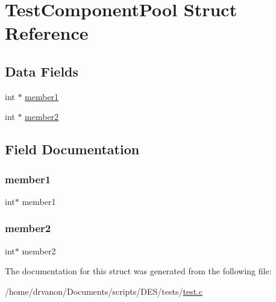 \hypertarget{struct_test_component_pool}{}\section{Test\+Component\+Pool Struct Reference}
\label{struct_test_component_pool}
\subsection*{Data Fields}
\begin{DoxyCompactItemize}
\item 
int $\ast$ \mbox{\hyperlink{struct_test_component_pool_a8a2b3ab64fa0522a285d284f6e365ab6}{member1}}
\item 
int $\ast$ \mbox{\hyperlink{struct_test_component_pool_a401fcf2bfe0aaaf96d646b535813c683}{member2}}
\end{DoxyCompactItemize}


\subsection{Field Documentation}
\mbox{\label{struct_test_component_pool_a8a2b3ab64fa0522a285d284f6e365ab6}} 
\subsubsection{\texorpdfstring{member1}{member1}}
{\footnotesize\ttfamily int$\ast$ member1}

\mbox{\label{struct_test_component_pool_a401fcf2bfe0aaaf96d646b535813c683}} 
\subsubsection{\texorpdfstring{member2}{member2}}
{\footnotesize\ttfamily int$\ast$ member2}



The documentation for this struct was generated from the following file\+:\begin{DoxyCompactItemize}
\item 
/home/drvanon/\+Documents/scripts/\+D\+E\+S/tests/\mbox{\hyperlink{test_8c}{test.\+c}}\end{DoxyCompactItemize}
